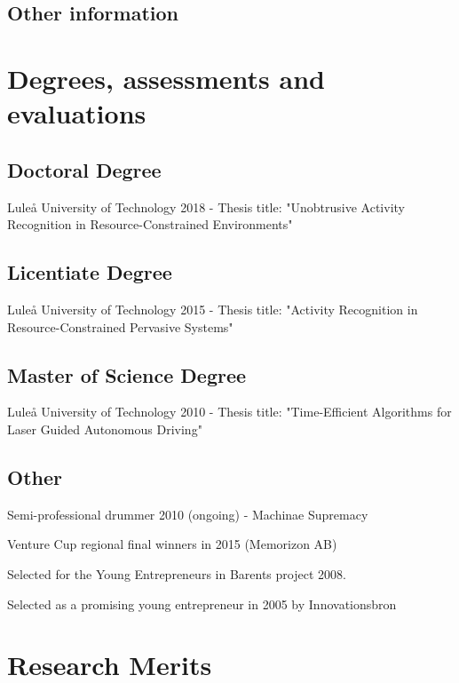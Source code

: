 \documentclass{article}
\begin{document}
\subsection{Other information}

\newpage

\section{Degrees, assessments and evaluations}
\subsection{Doctoral Degree}
Luleå University of Technology 2018 - Thesis title: "Unobtrusive Activity Recognition in Resource-Constrained Environments" \\

\subsection{Licentiate Degree}
Luleå University of Technology 2015 - Thesis title: "Activity Recognition in Resource-Constrained Pervasive Systems" \\

\subsection{Master of Science Degree}
Luleå University of Technology 2010 - Thesis title: "Time-Efficient Algorithms for Laser Guided Autonomous Driving" \\

\subsection{Other}
\begin{description}
\item Semi-professional drummer 2010 (ongoing) - Machinae Supremacy
\item Venture Cup regional final winners in 2015 (Memorizon AB)
\item Selected for the Young Entrepreneurs in Barents project 2008.
\item Selected as a promising young entrepreneur in 2005 by Innovationsbron
\end{description}


\newpage

\section{Research Merits}
\end{document}
